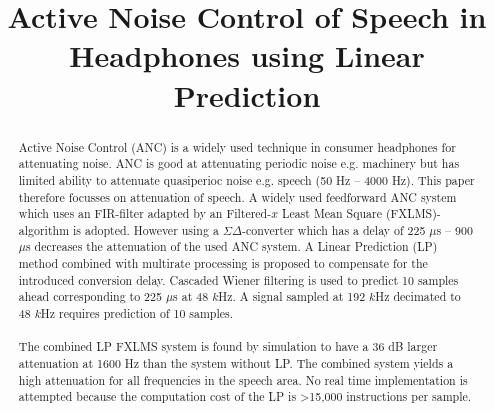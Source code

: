 \documentclass[conference]{IEEEtran}
\begin{document}
\title{Active Noise Control of Speech in Headphones using Linear Prediction}

\author{
}

\maketitle

\begin{abstract}
Active Noise Control (ANC) is a widely used technique in consumer headphones for attenuating noise. ANC is good at attenuating periodic noise e.g. machinery but has limited ability to attenuate quasiperioc noise e.g. speech (50 Hz -- 4000 Hz). This paper therefore focusses on attenuation of speech. A widely used feedforward ANC system which uses an FIR-filter adapted by an Filtered-$x$ Least Mean Square (FXLMS)-algorithm is adopted. However using a $\Sigma\Delta$-converter which has a delay of 225 $\mu$s -- 900 $\mu$s decreases the attenuation of the used ANC system. A Linear Prediction (LP) method combined with multirate processing is proposed to compensate for the introduced conversion delay. Cascaded Wiener filtering is used to predict 10 samples ahead corresponding to 225 $\mu$s at 48 $k$Hz. A signal sampled at 192 $k$Hz decimated to 48 $k$Hz requires prediction of 10 samples.  
\\\\
The combined LP FXLMS system is found by simulation to have a 36 dB larger attenuation at 1600 Hz than the system without LP. The combined system yields a high attenuation for all frequencies in the speech area. No real time implementation is attempted because the computation cost of the LP is >15,000 instructions per sample. %
\end{abstract}

\IEEEpeerreviewmaketitle












\end{document}
